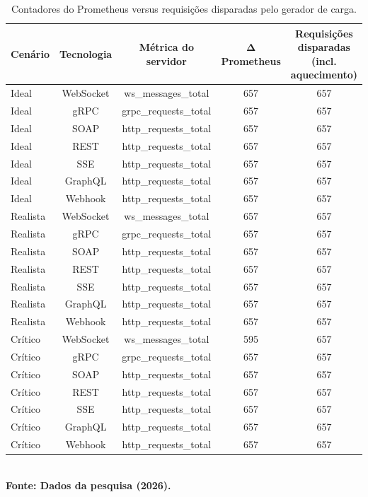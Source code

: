 \begin{table}[H]
\centering
\scriptsize
\caption{Contadores do Prometheus versus requisições disparadas pelo gerador de carga.}
\label{tab:telemetria}
\begin{tabular}{|l|c|c|c|c|}
\hline
\textbf{Cenário} & \textbf{Tecnologia} & \textbf{Métrica do servidor} & \textbf{Δ Prometheus} & \textbf{Requisições disparadas (incl. aquecimento)} \\ \hline
Ideal & WebSocket & ws_messages_total & 657 & 657 \\ \hline
Ideal & gRPC & grpc_requests_total & 657 & 657 \\ \hline
Ideal & SOAP & http_requests_total & 657 & 657 \\ \hline
Ideal & REST & http_requests_total & 657 & 657 \\ \hline
Ideal & SSE & http_requests_total & 657 & 657 \\ \hline
Ideal & GraphQL & http_requests_total & 657 & 657 \\ \hline
Ideal & Webhook & http_requests_total & 657 & 657 \\ \hline
Realista & WebSocket & ws_messages_total & 657 & 657 \\ \hline
Realista & gRPC & grpc_requests_total & 657 & 657 \\ \hline
Realista & SOAP & http_requests_total & 657 & 657 \\ \hline
Realista & REST & http_requests_total & 657 & 657 \\ \hline
Realista & SSE & http_requests_total & 657 & 657 \\ \hline
Realista & GraphQL & http_requests_total & 657 & 657 \\ \hline
Realista & Webhook & http_requests_total & 657 & 657 \\ \hline
Crítico & WebSocket & ws_messages_total & 595 & 657 \\ \hline
Crítico & gRPC & grpc_requests_total & 657 & 657 \\ \hline
Crítico & SOAP & http_requests_total & 657 & 657 \\ \hline
Crítico & REST & http_requests_total & 657 & 657 \\ \hline
Crítico & SSE & http_requests_total & 657 & 657 \\ \hline
Crítico & GraphQL & http_requests_total & 657 & 657 \\ \hline
Crítico & Webhook & http_requests_total & 657 & 657 \\ \hline
\end{tabular}
{\footnotesize\\ \textbf{Fonte: Dados da pesquisa (2026).}}
\end{table}
